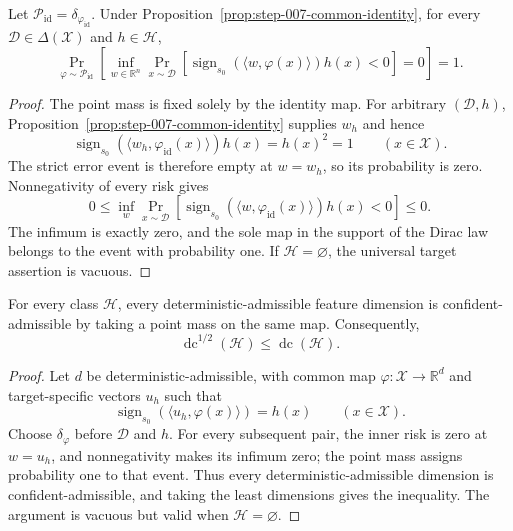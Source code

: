 \begin{proposition}
\label{prop:step-007-point-mass}
Let $\mathcal P_{\mathrm{id}}=\delta_{\varphi_{\mathrm{id}}}$.  Under
Proposition~\ref{prop:step-007-common-identity}, for every
$\mathcal D\in\Delta(\mathcal X)$ and $h\in\mathcal H$,
\[
\Pr_{\varphi\sim\mathcal P_{\mathrm{id}}}\!\left[
\inf_{w\in\mathbb R^n}\Pr_{x\sim\mathcal D}\!\left[
\operatorname{sign}_{s_0}(\langle w,\varphi(x)\rangle)h(x)<0
\right]=0\right]=1.
\]
\end{proposition}

\begin{proof}
The point mass is fixed solely by the identity map.  For arbitrary
$(\mathcal D,h)$, Proposition~\ref{prop:step-007-common-identity} supplies
$w_h$ and hence
\[
\operatorname{sign}_{s_0}(\langle w_h,\varphi_{\mathrm{id}}(x)\rangle)h(x)
=h(x)^2=1
\qquad(x\in\mathcal X).
\]
The strict error event is therefore empty at $w=w_h$, so its probability is
zero.  Nonnegativity of every risk gives
\[
0\leq\inf_w\Pr_{x\sim\mathcal D}
 [\operatorname{sign}_{s_0}(\langle w,\varphi_{\mathrm{id}}(x)\rangle)h(x)<0]
\leq0.
\]
The infimum is exactly zero, and the sole map in the support of the Dirac law
belongs to the event with probability one.  If $\mathcal H=\varnothing$,
the universal target assertion is vacuous.
\end{proof}

\begin{lemma}
\label{lem:step-007-deterministic-to-confident}
For every class $\mathcal H$, every deterministic-admissible feature
dimension is confident-admissible by taking a point mass on the same map.
Consequently,
\[
\operatorname{dc}^{1/2}(\mathcal H)\leq\operatorname{dc}(\mathcal H).
\]
\end{lemma}

\begin{proof}
Let $d$ be deterministic-admissible, with common map
$\varphi:\mathcal X\to\mathbb R^d$ and target-specific vectors $u_h$ such
that
\[
\operatorname{sign}_{s_0}(\langle u_h,\varphi(x)\rangle)=h(x)
\qquad(x\in\mathcal X).
\]
Choose $\delta_\varphi$ before $\mathcal D$ and $h$.  For every subsequent
pair, the inner risk is zero at $w=u_h$, and nonnegativity makes its infimum
zero; the point mass assigns probability one to that event.  Thus every
deterministic-admissible dimension is confident-admissible, and taking the
least dimensions gives the inequality.  The argument is vacuous but valid
when $\mathcal H=\varnothing$.
\end{proof}

